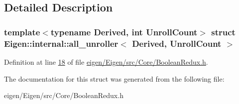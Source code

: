 \subsection{Detailed Description}
\subsubsection*{template$<$typename Derived, int Unroll\+Count$>$\newline
struct Eigen\+::internal\+::all\+\_\+unroller$<$ Derived, Unroll\+Count $>$}



Definition at line \hyperlink{eigen_2_eigen_2src_2_core_2_boolean_redux_8h_source_l00018}{18} of file \hyperlink{eigen_2_eigen_2src_2_core_2_boolean_redux_8h_source}{eigen/\+Eigen/src/\+Core/\+Boolean\+Redux.\+h}.



The documentation for this struct was generated from the following file\+:\begin{DoxyCompactItemize}
\item 
eigen/\+Eigen/src/\+Core/\+Boolean\+Redux.\+h\end{DoxyCompactItemize}
